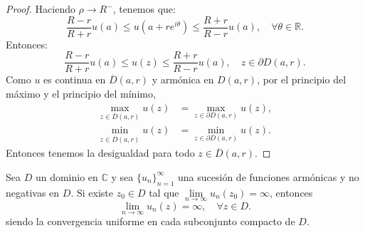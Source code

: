 \begin{proof}
    Haciendo $\rho \to R^-$, tenemos que:
    $$\frac{R-r}{R+r}u(a) \leq u(a+re^{i\theta}) \leq \frac{R+r}{R-r}u(a), \quad \forall \theta \in \mathbb{R}.$$
    Entonces:
    $$\frac{R-r}{R+r}u(a) \leq u(z) \leq \frac{R+r}{R-r}u(a), \quad z \in \partial D(a, r).$$
    Como $u$ es continua en $\overline{D}(a, r)$ y armónica en $D(a, r)$, por el principio del máximo y el principio del mínimo,
    \begin{align*}
        \max_{z \in \overline{D}(a, r)} u(z) & = \max_{z \in \partial D(a, r)} u(z), \\
        \min_{z \in \overline{D}(a, r)} u(z) & = \min_{z \in \partial D(a, r)} u(z).
    \end{align*}
    Entonces tenemos la desigualdad para todo $z \in \overline{D}(a, r)$.
\end{proof}

\begin{proposition}
    Sea $D$ un dominio en $\mathbb{C}$ y sea $\{u_n\}_{n=1}^\infty$ una sucesión de funciones armónicas y no negativas en $D$.
    Si existe $z_0 \in D$ tal que $\lim\limits_{n \to \infty} u_n(z_0) = \infty$, entonces
    $$\lim_{n \to \infty} u_n(z) = \infty, \quad \forall z \in D.$$
    siendo la convergencia uniforme en cada subconjunto compacto de $D$.
\end{proposition}

